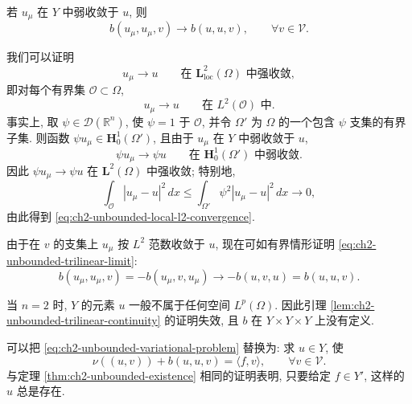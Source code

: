\begin{Proof}
\begin{Lemma}
\label{lem:ch2-unbounded-trilinear-limit}
若 $u_\mu$ 在 $Y$ 中弱收敛于 $u$, 则
\begin{equation}
b(u_\mu,u_\mu,v)\longrightarrow b(u,u,v),
\qquad\forall v\in\mathcal V.
\label{eq:ch2-unbounded-trilinear-limit}
\end{equation}
\end{Lemma}

\begin{Proof}
我们可以证明
\begin{equation}
u_\mu\longrightarrow u\qquad\text{在 }\mathbf L_{\mathrm{loc}}^2(\Omega)\text{ 中强收敛},
\label{eq:ch2-unbounded-local-strong-convergence}
\end{equation}
即对每个有界集 $\mathcal O\subset\Omega$,
\begin{equation}
u_\mu\longrightarrow u\qquad\text{在 }L^2(\mathcal O)\text{ 中}.
\label{eq:ch2-unbounded-local-l2-convergence}
\end{equation}
事实上, 取 $\psi\in\mathcal D(\mathbb R^n)$, 使 $\psi=1$ 于 $\mathcal O$, 并令 $\Omega'$ 为 $\Omega$ 的一个包含 $\psi$ 支集的有界子集. 则函数 $\psi u_\mu\in\mathbf H_0^1(\Omega')$, 且由于 $u_\mu$ 在 $Y$ 中弱收敛于 $u$,
\[
\psi u_\mu\longrightarrow\psi u
\qquad\text{在 }\mathbf H_0^1(\Omega')\text{ 中弱收敛}.
\]
因此 $\psi u_\mu\to\psi u$ 在 $\mathbf L^2(\Omega)$ 中强收敛; 特别地,
\[
\int_{\mathcal O}|u_\mu-u|^2\,dx
\leq\int_{\Omega'}\psi^2|u_\mu-u|^2\,dx\longrightarrow0,
\]
由此得到 \eqref{eq:ch2-unbounded-local-l2-convergence}.

由于在 $v$ 的支集上 $u_\mu$ 按 $L^2$ 范数收敛于 $u$, 现在可如有界情形证明 \eqref{eq:ch2-unbounded-trilinear-limit}:
\[
b(u_\mu,u_\mu,v)=-b(u_\mu,v,u_\mu)
\longrightarrow-b(u,v,u)=b(u,u,v).
\]
\end{Proof}
\end{Proof}

\hypertarget{chapter-02-page-130}{}
\begin{Remark}
\label{rem:ch2-unbounded-two-dimensions}
当 $n=2$ 时, $Y$ 的元素 $u$ 一般不属于任何空间 $L^p(\Omega)$. 因此引理 \ref{lem:ch2-unbounded-trilinear-continuity} 的证明失效, 且 $b$ 在 $Y\times Y\times Y$ 上没有定义.

可以把 \eqref{eq:ch2-unbounded-variational-problem} 替换为: 求 $u\in Y$, 使
\[
\nu((u,v))+b(u,u,v)=\langle f,v\rangle,
\qquad\forall v\in\mathcal V.
\]
与定理 \ref{thm:ch2-unbounded-existence} 相同的证明表明, 只要给定 $f\in Y'$, 这样的 $u$ 总是存在.
\end{Remark}

